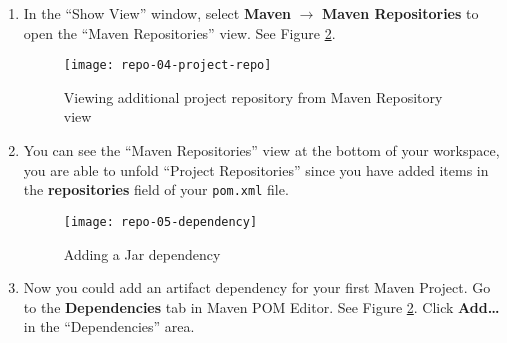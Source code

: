 \begin{enumerate}
\item In the ``Show View'' window, select \textbf{Maven} $\rightarrow$
\textbf{Maven Repositories} to open the ``Maven Repositories'' view. See Figure
\ref{repo-05-dependency}.

\begin{figure}[t]
\centering
\texttt{[image: repo-04-project-repo]}
\caption{Viewing additional project repository from Maven Repository view\label{repo-04-project-repo}}
\end{figure}

\item You can see the ``Maven Repositories'' view at the bottom of your
workspace, you are able to unfold ``Project Repositories'' since you have added
items in the \textbf{repositories} field of your \verb|pom.xml| file.


\begin{figure}[t]
\centering
\texttt{[image: repo-05-dependency]}
\caption{Adding a Jar dependency\label{repo-05-dependency}}
\end{figure}

\item Now you could add an artifact dependency for your first Maven Project. Go
to the \textbf{Dependencies} tab in Maven POM Editor. See Figure
\ref{repo-05-dependency}. Click \textbf{Add\ldots} in the ``Dependencies'' area.


\end{enumerate}
